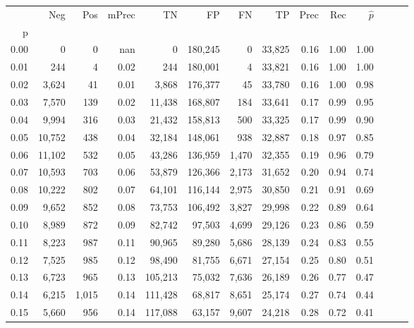 \begin{tabular}{rrrrrrrrrrrrrr}
\toprule
{} &     Neg &    Pos & mPrec &       TN &       FP &      FN &      TP &  Prec &   Rec & $\hat{p}$ \\
p    &         &        &       &          &          &         &         &       &       &           \\
\midrule
0.00 &       0 &      0 &   nan &        0 &  180,245 &       0 &  33,825 &  0.16 &  1.00 &      1.00 \\
0.01 &     244 &      4 &  0.02 &      244 &  180,001 &       4 &  33,821 &  0.16 &  1.00 &      1.00 \\
0.02 &   3,624 &     41 &  0.01 &    3,868 &  176,377 &      45 &  33,780 &  0.16 &  1.00 &      0.98 \\
0.03 &   7,570 &    139 &  0.02 &   11,438 &  168,807 &     184 &  33,641 &  0.17 &  0.99 &      0.95 \\
0.04 &   9,994 &    316 &  0.03 &   21,432 &  158,813 &     500 &  33,325 &  0.17 &  0.99 &      0.90 \\
0.05 &  10,752 &    438 &  0.04 &   32,184 &  148,061 &     938 &  32,887 &  0.18 &  0.97 &      0.85 \\
0.06 &  11,102 &    532 &  0.05 &   43,286 &  136,959 &   1,470 &  32,355 &  0.19 &  0.96 &      0.79 \\
0.07 &  10,593 &    703 &  0.06 &   53,879 &  126,366 &   2,173 &  31,652 &  0.20 &  0.94 &      0.74 \\
0.08 &  10,222 &    802 &  0.07 &   64,101 &  116,144 &   2,975 &  30,850 &  0.21 &  0.91 &      0.69 \\
0.09 &   9,652 &    852 &  0.08 &   73,753 &  106,492 &   3,827 &  29,998 &  0.22 &  0.89 &      0.64 \\
0.10 &   8,989 &    872 &  0.09 &   82,742 &   97,503 &   4,699 &  29,126 &  0.23 &  0.86 &      0.59 \\
0.11 &   8,223 &    987 &  0.11 &   90,965 &   89,280 &   5,686 &  28,139 &  0.24 &  0.83 &      0.55 \\
0.12 &   7,525 &    985 &  0.12 &   98,490 &   81,755 &   6,671 &  27,154 &  0.25 &  0.80 &      0.51 \\
0.13 &   6,723 &    965 &  0.13 &  105,213 &   75,032 &   7,636 &  26,189 &  0.26 &  0.77 &      0.47 \\
0.14 &   6,215 &  1,015 &  0.14 &  111,428 &   68,817 &   8,651 &  25,174 &  0.27 &  0.74 &      0.44 \\
0.15 &   5,660 &    956 &  0.14 &  117,088 &   63,157 &   9,607 &  24,218 &  0.28 &  0.72 &      0.41 \\

\end{tabular}
